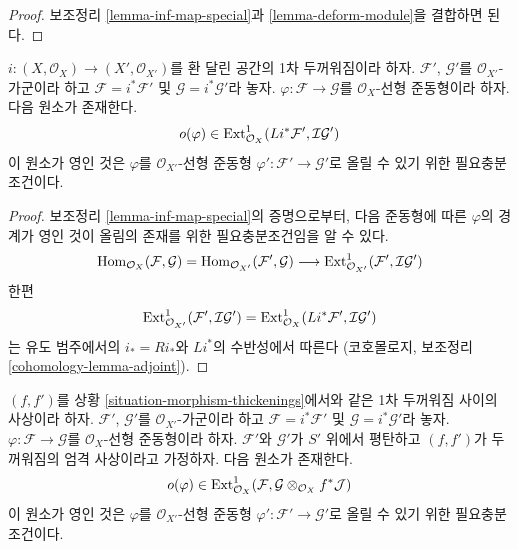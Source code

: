 \begin{proof}
보조정리 \ref{lemma-inf-map-special}과
\ref{lemma-deform-module}을 결합하면 된다.
\end{proof}

\begin{lemma}
\label{lemma-inf-obs-map-special}
$i : (X, \mathcal{O}_X) \to (X', \mathcal{O}_{X'})$를 환 달린 공간의
1차 두꺼워짐이라 하자. $\mathcal{F}'$, $\mathcal{G}'$를
$\mathcal{O}_{X'}$-가군이라 하고 $\mathcal{F} = i^*\mathcal{F}'$ 및
$\mathcal{G} = i^*\mathcal{G}'$라 놓자.
$\varphi : \mathcal{F} \to \mathcal{G}$를 $\mathcal{O}_X$-선형
준동형이라 하자. 다음 원소가 존재한다.
$$
o(\varphi) \in
\mathop{\mathrm{Ext}}\nolimits^1_{\mathcal{O}_X}(Li^*\mathcal{F}',
\mathcal{I}\mathcal{G}')
$$
이 원소가 영인 것은 $\varphi$를 $\mathcal{O}_{X'}$-선형 준동형
$\varphi' : \mathcal{F}' \to \mathcal{G}'$로 올릴 수 있기 위한
필요충분조건이다.
\end{lemma}

\begin{proof}
보조정리 \ref{lemma-inf-map-special}의 증명으로부터, 다음 준동형에
따른 $\varphi$의 경계가 영인 것이 올림의 존재를 위한
필요충분조건임을 알 수 있다.
$$
\mathop{\mathrm{Hom}}\nolimits_{\mathcal{O}_X}(\mathcal{F}, \mathcal{G}) =
\mathop{\mathrm{Hom}}\nolimits_{\mathcal{O}_{X'}}(\mathcal{F}', \mathcal{G}) \longrightarrow
\mathop{\mathrm{Ext}}\nolimits^1_{\mathcal{O}_{X'}}(\mathcal{F}', \mathcal{I}\mathcal{G}')
$$
한편
$$
\mathop{\mathrm{Ext}}\nolimits^1_{\mathcal{O}_{X'}}(\mathcal{F}', \mathcal{I}\mathcal{G}') =
\mathop{\mathrm{Ext}}\nolimits^1_{\mathcal{O}_X}(Li^*\mathcal{F}', \mathcal{I}\mathcal{G}')
$$
는 유도 범주에서의 $i_* = Ri_*$와 $Li^*$의 수반성에서 따른다
(코호몰로지, 보조정리 \ref{cohomology-lemma-adjoint}).
\end{proof}

\begin{lemma}
\label{lemma-inf-obs-map-rel}
$(f, f')$를 상황 \ref{situation-morphism-thickenings}에서와 같은
1차 두꺼워짐 사이의 사상이라 하자. $\mathcal{F}'$, $\mathcal{G}'$를
$\mathcal{O}_{X'}$-가군이라 하고 $\mathcal{F} = i^*\mathcal{F}'$ 및
$\mathcal{G} = i^*\mathcal{G}'$라 놓자.
$\varphi : \mathcal{F} \to \mathcal{G}$를 $\mathcal{O}_X$-선형
준동형이라 하자. $\mathcal{F}'$와 $\mathcal{G}'$가 $S'$ 위에서
평탄하고 $(f, f')$가 두꺼워짐의 엄격 사상이라고 가정하자.
다음 원소가 존재한다.
$$
o(\varphi) \in  \mathop{\mathrm{Ext}}\nolimits^1_{\mathcal{O}_X}(\mathcal{F},
\mathcal{G} \otimes_{\mathcal{O}_X} f^*\mathcal{J})
$$
이 원소가 영인 것은 $\varphi$를 $\mathcal{O}_{X'}$-선형 준동형
$\varphi' : \mathcal{F}' \to \mathcal{G}'$로 올릴 수 있기 위한
필요충분조건이다.
\end{lemma}

